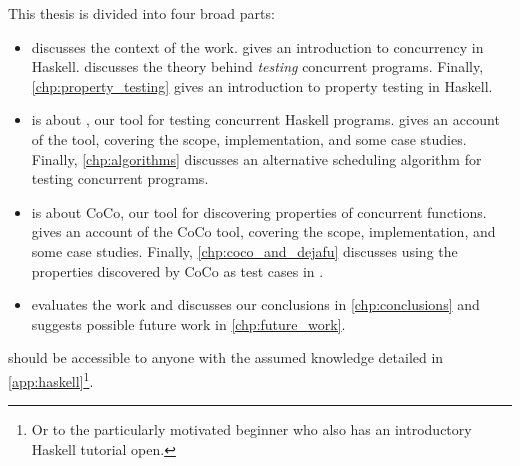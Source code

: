 This thesis is divided into four broad parts:

\begin{itemize}
\item {} discusses the context of the work.
   gives an introduction to concurrency
  in Haskell.   discusses the theory behind
  \emph{testing} concurrent programs.  Finally,
  \cref{chp:property_testing} gives an introduction to property
  testing in Haskell.

\item {} is about \dejafu{}, our tool for testing
  concurrent Haskell programs.   gives an account of
  the \dejafu{} tool, covering the scope, implementation, and some
  case studies.  Finally, \cref{chp:algorithms} discusses an
  alternative scheduling algorithm for testing concurrent programs.

\item {} is about CoCo, our tool for discovering
  properties of concurrent functions.   gives an
  account of the CoCo tool, covering the scope, implementation, and
  some case studies.  Finally, \cref{chp:coco_and_dejafu} discusses
  using the properties discovered by CoCo as test cases in \dejafu{}.

\item {} evaluates the work and discusses our conclusions
  in \cref{chp:conclusions} and suggests possible future work in
  \cref{chp:future_work}.
\end{itemize}

 should be
accessible to anyone with the assumed knowledge detailed in
\cref{app:haskell}\footnote{Or to the particularly motivated beginner
  who also has an introductory Haskell tutorial open.}.
